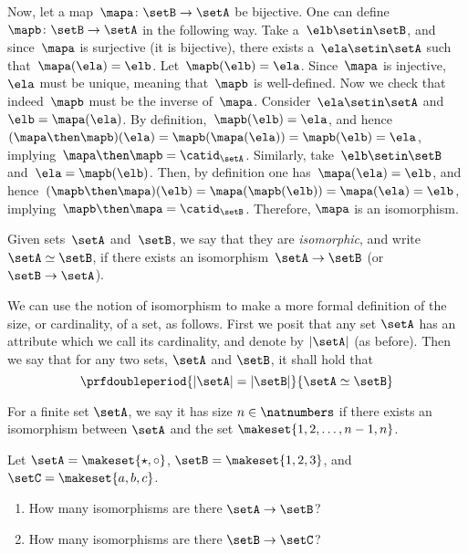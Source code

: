 \begin{solution}
    Now, let a map~$\mapa\colon \setB \to \setA$ be bijective.
    One can define~$\mapb\colon \setB\to \setA$ in the following way.
    Take a~$\elb\setin\setB$, and since~$\mapa$ is surjective (it is bijective), there exists a~$\ela\setin\setA$ such that~$\mapa(\ela)=\elb$.
    Let~$\mapb(\elb)=\ela$.
    Since~$\mapa$ is injective,~$\ela$ must be unique, meaning that~$\mapb$ is well-defined.
    Now we check that indeed~$\mapb$ must be the inverse of~$\mapa$.
    Consider~$\ela \setin\setA$ and~$\elb=\mapa(\ela)$.
    By definition,~$\mapb(\elb)=\ela$, and hence~$(\mapa\then \mapb)(\ela)=\mapb(\mapa(\ela))=\mapb(\elb)=\ela$, implying~$\mapa\then \mapb=\catid_\setA$.
    Similarly, take~$\elb\setin\setB$ and~$\ela=\mapb(\elb)$.
    Then, by definition one has~$\mapa(\ela)=\elb$, and hence~$(\mapb\then \mapa)(\elb)=\mapa(\mapb(\elb))=\mapa(\ela)=\elb$, implying~$\mapb\then \mapa=\catid_\setB$.
    Therefore, $\mapa$ is an isomorphism.
\end{solution}

\begin{definition}
    Given sets~$\setA$ and~$\setB$, we say that they are \emph{isomorphic}, and write~$\setA \simeq \setB$,
    if there exists an isomorphism~$\setA \to \setB$ (or~$\setB \to \setA$).
\end{definition}

We can use the notion of isomorphism to make a more formal definition of the size, or cardinality, of a set, as follows.
First we posit that any set $\setA$ has an attribute which we call its cardinality, and denote by $\vert \setA \vert$ (as before).
Then we say that for any two sets, $\setA$ and $\setB$, it shall hold that
\begin{equation}
    \prfdoubleperiod{ \vert \setA \vert = \vert \setB \vert }{ \setA \simeq \setB }
\end{equation}

For a finite set $\setA$, we say it has size $n \in \natnumbers$ if there exists an isomorphism between $\setA$ and the set $\makeset{1,2, \dots, n-1, n}$.

\begin{gradedexercise}
    \label{ex:CountingIsos}

    Let $\setA = \makeset{\star, \circ }$, $\setB = \makeset{1, 2, 3}$, and $\setC = \makeset{a, b, c}$.
    \begin{enumerate}
        \item How many isomorphisms are there $\setA \to \setB$?
        \item How many isomorphisms are there $\setB \to \setC$?
    \end{enumerate}
\end{gradedexercise}

